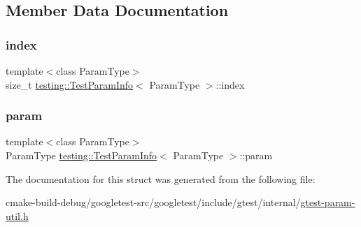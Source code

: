 \subsection{Member Data Documentation}
\mbox{\label{structtesting_1_1TestParamInfo_ad4d7bc02cbcc571eb3c1d2ec3ba5bb53}} 
\subsubsection{\texorpdfstring{index}{index}}
{\footnotesize\ttfamily template$<$class Param\+Type$>$ \\
size\+\_\+t \mbox{\hyperlink{structtesting_1_1TestParamInfo}{testing\+::\+Test\+Param\+Info}}$<$ Param\+Type $>$\+::index}

\mbox{\label{structtesting_1_1TestParamInfo_a146d921039f9da8b1336f7cc6e8436c2}} 
\subsubsection{\texorpdfstring{param}{param}}
{\footnotesize\ttfamily template$<$class Param\+Type$>$ \\
Param\+Type \mbox{\hyperlink{structtesting_1_1TestParamInfo}{testing\+::\+Test\+Param\+Info}}$<$ Param\+Type $>$\+::param}



The documentation for this struct was generated from the following file\+:\begin{DoxyCompactItemize}
\item 
cmake-\/build-\/debug/googletest-\/src/googletest/include/gtest/internal/\mbox{\hyperlink{gtest-param-util_8h}{gtest-\/param-\/util.\+h}}\end{DoxyCompactItemize}
